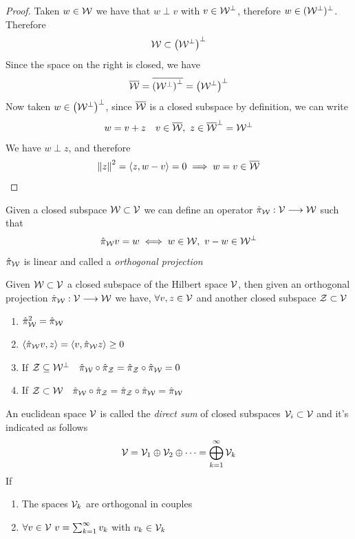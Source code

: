 \documentclass[../complete.tex]{subfiles}
\begin{document}
\begin{proof}
	Taken $w\in\mathcal{W}$ we have that $w\perp v$ with $v\in\mathcal{W}^\perp$, therefore $w\in(\mathcal{W}^\perp)^\perp$. Therefore
	\begin{equation*}
		\mathcal{W}\subset\left( \mathcal{W}^\perp \right)^\perp
	\end{equation*}
	Since the space on the right is closed, we have
	\begin{equation*}
		\overline{\mathcal{W}}=\overline{\left( \mathcal{W}^\perp \right)^\perp}=\left( \mathcal{W}^\perp \right)^\perp
	\end{equation*}
	Now taken $w\in\left( \mathcal{W}^\perp \right)^\perp$, since $\overline{\mathcal{W}}$ is a closed subspace by definition, we can write
	\begin{equation*}
		w=v+z\quad v\in\overline{\mathcal{W}},\ z\in\overline{\mathcal{W}}^\perp=\mathcal{W}^\perp
	\end{equation*}
	We have $w\perp z$, and therefore
	\begin{equation*}
		\norm{z}^2=\langle z, w-v \rangle=0\implies{} w=v\in\overline{\mathcal{W}}
	\end{equation*}
\end{proof}
\begin{dfn}
	Given a closed subspace $\mathcal{W}\subset\mathcal{V}$ we can define an operator $\hat{\pi}_{\mathcal{W}}:\mathcal{V}\overset{}{\longrightarrow}\mathcal{W}$ such that
	\begin{equation}
		\hat{\pi}_{\mathcal{W}} v=w\iff w\in\mathcal{W},\ v-w\in\mathcal{W}^\perp
		\label{eq:orthprojection}
	\end{equation}
	$\hat{\pi}_{\mathcal{W}}$ is linear and called a \textit{orthogonal projection}
\end{dfn}
\begin{thm}
	Given $\mathcal{W}\subset\mathcal{V}$ a closed subspace of the Hilbert space $\mathcal{V}$, then given an orthogonal projection $\hat{\pi}_{\mathcal{W}}:\mathcal{V}\overset{}{\longrightarrow}\mathcal{W}$ we have, $\forall v,z\in\mathcal{V}$ and another closed subspace $\mathcal{Z}\subset\mathcal{V}$
	\begin{enumerate}
	\item $\hat{\pi}_{\mathcal{W}}^2=\hat{\pi}_{\mathcal{W}}$
	\item $\langle \hat{\pi}_{\mathcal{W}} v, z \rangle=\langle v, \hat{\pi}_{\mathcal{W}} z \rangle\ge0$
	\item If $\mathcal{Z}\subseteq\mathcal{W}^\perp\quad\hat{\pi}_{\mathcal{W}}\circ\hat{\pi}_{\mathcal{Z}}=\hat{\pi}_{\mathcal{Z}}\circ\hat{\pi}_{\mathcal{W}}=0$
	\item If $\mathcal{Z}\subset\mathcal{W}\quad\hat{\pi}_{\mathcal{W}}\circ\hat{\pi}_{\mathcal{Z}}=\hat{\pi}_{\mathcal{Z}}\circ\hat{\pi}_{\mathcal{W}}=\hat{\pi}_{\mathcal{W}}$
	\end{enumerate}
\end{thm}
\begin{dfn}
	An euclidean space $\mathcal{V}$ is called the \textit{direct sum} of closed subspaces $\mathcal{V}_i\subset\mathcal{V}$ and it's indicated as follows
	\begin{equation}
		\mathcal{V}=\mathcal{V}_1\oplus\mathcal{V}_2\oplus\cdots=\bigoplus_{k=1}^\infty\mathcal{V}_k
		\label{eq:directsum}
	\end{equation}
	If
	\begin{enumerate}
	\item The spaces $\mathcal{V}_k$ are orthogonal in couples
	\item $\forall v\in\mathcal{V}\ v=\sum_{k=1}^\infty v_k$ with $v_k\in\mathcal{V}_k$
	\end{enumerate}
\end{dfn}
\end{document}
